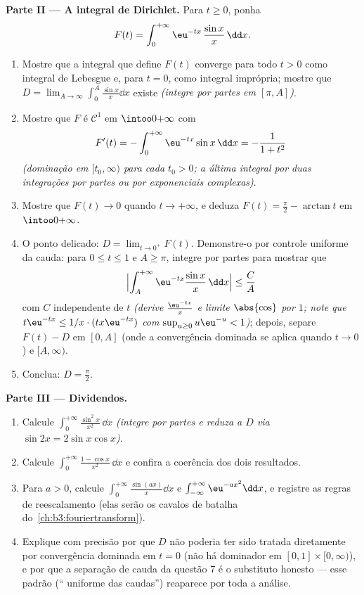 \begin{problem}
\medskip
\noindent\textbf{Parte II --- A integral de Dirichlet.} Para $t
\geq 0$,
ponha
\[
F(t) = \int_0^{+\infty}\eu^{-tx}\,\frac{\sin x}{x}\,\dd x .
\]
\begin{enumerate}[resume]
  \item Mostre que a integral que define $F(t)$ converge para todo
        $t > 0$ como integral de Lebesgue e, para $t = 0$, como
        integral imprópria; mostre que $D =
        \lim_{A\to\infty}\int_0^A\frac{\sin x}x\dd x$ existe \emph{(integre por
        partes em $[\pi, A]$)}.
  \item Mostre que $F$ é $\mathcal C^1$ em $\intoo0{+\infty}$ com
        \[
        F'(t) = -\int_0^{+\infty}\eu^{-tx}\sin x\,\dd x
        = -\frac{1}{1 + t^2}
        \]
        \emph{(dominação em $[t_0, \infty)$ para cada $t_0 >
        0$; a última integral por
        duas integrações por partes ou por exponenciais complexas)}.
  \item Mostre que $F(t) \to 0$ quando $t \to +\infty$, e deduza $F(t)
        = \frac\pi2 - \arctan t$ em $\intoo0{+\infty}$.
  \item O ponto delicado: $D = \lim_{t\to0^+}F(t)$. Demonstre-o por controle uniforme da
        cauda: para $0 \leq t \leq 1$ e $A \geq \pi$, integre por partes para mostrar que
        \[
        \Bigl|\int_A^{+\infty}\eu^{-tx}\frac{\sin
        x}x\,\dd x\Bigr| \leq \frac{C}{A}
        \]
        com $C$ independente de $t$ \emph{(derive $\frac{\eu^{-tx}}x$ e limite
        $\abs{\cos}$ por $1$; note que $t\eu^{-tx} \leq 1/x\cdot(tx\eu^{-tx})$ com $\sup_{u\geq0}u\eu^{-u} < 1$)}; depois, separe
        $F(t) - D$ em $[0, A]$ (onde a convergência dominada se aplica
        quando $t \to 0$) e $[A, \infty)$.
  \item Conclua: $D = \frac\pi2$.
\end{enumerate}

\medskip
\noindent\textbf{Parte III --- Dividendos.}
\begin{enumerate}[resume]
  \item Calcule $\int_0^{+\infty}\frac{\sin^2x}{x^2}\,\dd x$ \emph{(integre por partes e reduza a $D$ via
        $\sin
        2x = 2\sin x\cos x$)}.
  \item Calcule $\int_0^{+\infty}\frac{1 -
        \cos x}{x^2}\,\dd x$ e confira a coerência dos dois resultados.
  \item Para $a > 0$, calcule $\int_0^{+\infty}\frac{\sin(ax)}x\dd x$ e $\int_{-\infty}^{+\infty}\eu^{-ax^2}\dd x$, e registre as regras de
        reescalamento (elas serão os cavalos de batalha do~\cref{ch:b3:fouriertransform}).
  \item Explique com precisão por que $D$ não poderia ter sido
        tratada diretamente por convergência dominada em $t = 0$
        (não há dominador  em $[0,1]\times[0,\infty)$), e por que a separação de
        cauda da questão 7 é o substituto honesto --- esse padrão
        (`` uniforme das caudas'') reaparece por toda a
        análise.
\end{enumerate}


\end{problem}
